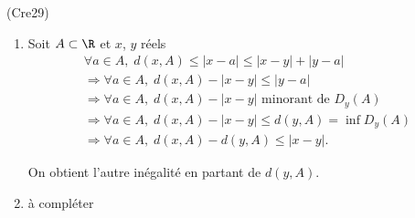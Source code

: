 \begin{tiny}(Cre29)\end{tiny}
\begin{enumerate}
  \item Soit $A\subset \R$ et $x$, $y$ réels
\begin{multline*}
\forall a \in A, \;  d(x,A) \leq |x-a| \leq |x-y| + |y-a| \\
\Rightarrow \forall a \in A, \; d(x,A) - |x-y| \leq  |y-a| \\
\Rightarrow \forall a \in A, \; d(x,A) - |x-y| \text{ minorant de } D_y(A) \\
\Rightarrow \forall a \in A, \; d(x,A) - |x-y| \leq d(y,A)= \inf D_y(A) \\
\Rightarrow \forall a \in A, \; d(x,A) - d(y,A) \leq |x-y|.
\end{multline*}

On obtient l'autre inégalité en partant de $d(y,A)$.
  \item à compléter
\end{enumerate}
